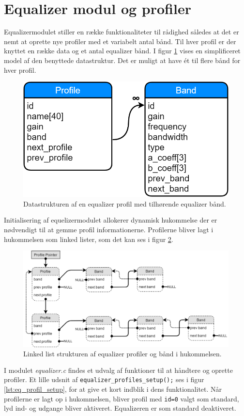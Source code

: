 \section{Equalizer modul og profiler}

Equalizermodulet stiller en række funktionaliteter til rådighed således at det er nemt at oprette nye profiler med et variabelt antal bånd.
Til hver profil er der knyttet en række data og et antal equalizer bånd.
I figur \ref{fig:eq-profile-db} vises en simplificeret model af den benyttede datastruktur.
Det er muligt at have ét til flere bånd for hver profil.

\begin{figure}[h!]
	\centering
	\includegraphics[width=.4\textwidth]{billeder/eq_profile_db.png}
	\caption{Datastrukturen af en equalizer profil med tilhørende equalizer bånd.}
	\label{fig:eq-profile-db}
\end{figure}

Initialisering af equelizermodulet allokerer dynamisk hukommelse der er nødvendigt til at gemme profil informationerne.
Profilerne bliver lagt i hukommelsen som linked lister, som det kan ses i figur \ref{fig:eq-profile-linked}.

\begin{figure}[h!]
	\centering
	\includegraphics[width=.9\textwidth]{billeder/eq_linked_profiles.png}
	\caption{Linked list strukturen af equalizer profiler og bånd i hukommelsen.}
	\label{fig:eq-profile-linked}
\end{figure}

I modulet \textit{equalizer.c} findes et udvalg af funktioner til at håndtere og oprette profiler.
Et lille udsnit af \texttt{equalizer\_profiles\_setup();} ses i figur \ref{lst:eq_profil_setup}, for at give et kort indblik i dens funktionalitet.
Når profilerne er lagt op i hukommelsen, bliver profil med \texttt{id=0} valgt som standard, lyd ind- og udgange bliver aktiveret.
Equalizeren er som standard deaktiveret.

